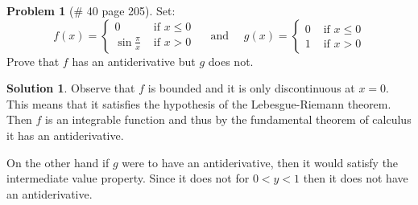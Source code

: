 \documentclass{article}
\theoremstyle{definition}
\newtheorem*{soln}{Solution}
\newtheorem*{prob}{Problem}
\theoremstyle{theorem}
\begin{document}
\begin{prob}[\# 40  page 205]
    Set:
    $$ f(x) = \begin{cases} 0 & \text{ if } x\leq 0\\
    \sin\frac \pi x & \text{ if } x>0\end{cases}\quad \text{ and }\quad g(x) =\begin{cases} 0 & \text{ if } x\leq 0\\
    1 & \text{ if } x>0\end{cases}  $$ 
    Prove that $f$ has an antiderivative but $g$ does not.
\end{prob}
\begin{soln}
    Observe that $f$ is bounded and it is only discontinuous at $x=0$. This means that it satisfies the hypothesis of the Lebesgue-Riemann theorem. Then $f$ is an integrable function and thus by the fundamental theorem of calculus it has an antiderivative. 

    On the other hand if $g$ were to have an antiderivative, then it would satisfy the intermediate value property. Since it does not for $0<y<1$ then it does not have an antiderivative.
\end{soln}
\vspace{1in}
\end{document}
